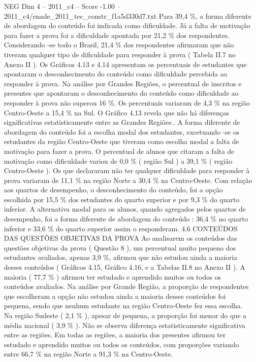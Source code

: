 \begin{textsample}{NEG Dim 4 – 2011\_c4 – Score -1.00 – 2011\_c4/enade\_2011\_tec\_constr\_f1a5d330d7.txt}
Para 39,4 \%, a forma diferente de abordagem do conteúdo foi indicada como dificuldade.
Já a falta de motivação para fazer a prova foi a dificuldade apontada por 21,2 \% dos respondentes.
Considerando -se todo o Brasil, 21,4 \% dos respondentes afirmaram que não tiveram qualquer tipo de dificuldade para responder à prova ( Tabela II.7 no Anexo II ).
Os Gráficos 4.13 e 4.14 apresentam os percentuais de estudantes que apontaram o desconhecimento do conteúdo como dificuldade percebida ao responder à prova.
Na análise por Grandes Regiões, o percentual de inscritos e presentes que apontaram o desconhecimento do conteúdo como dificuldade ao responder à prova não superou 16 \%.
Os percentuais variaram de 4,3 \% na região Centro-Oeste a 15,4 \% na Sul.
O Gráfico 4.13 revela que não há diferenças significativas estatisticamente entre as Grandes Regiões..
A forma diferente de abordagem do conteúdo foi a escolha modal dos estudantes, excetuando -se os estudantes da região Centro-Oeste que tiveram como escolha modal a falta de motivação para fazer a prova.
O percentual de alunos que citaram a falta de motivação como dificuldade variou de 0,0 \% ( região Sul ) a 39,1 \% ( região Centro-Oeste ).
Os que declararam não ter qualquer dificuldade para responder à prova variaram de 11,1 \% na região Norte a 30,4 \% na Centro-Oeste.
Com relação aos quartos de desempenho, o desconhecimento do conteúdo, foi a opção escolhida por 15,5 \% dos estudantes do quarto superior e por 9,3 \% do quarto inferior.
A alternativa modal para os alunos, quando agregados pelos quartos de desempenho, foi a forma diferente de abordagem do conteúdo : 36,4 \% no quarto inferior e 33,6 \% do quarto superior assim o responderam. 4.6 CONTEÚDOS DAS QUESTÕES OBJETIVAS DA PROVA Ao analisarem os conteúdos das questões objetivas da prova ( Questão 8 ), um percentual muito pequeno dos estudantes avaliados, apenas 3,9 \%, afirmou que não estudou ainda a maioria desses conteúdos ( Gráficos 4.15, Gráfico 4.16, e a Tabelas II.8 no Anexo II ).
A maioria ( 77,7 \% ) afirmou ter estudado e aprendido muitos ou todos os conteúdos avaliados.
Na análise por Grande Região, a proporção de respondentes que escolheram a opção não estudou ainda a maioria desses conteúdos foi pequena, sendo que nenhum estudante na região Centro-Oeste fez essa escolha.
Na região Sudeste ( 2,1 \% ), apesar de pequena, a proporção foi menor do que a média nacional ( 3,9 \% ).
Não se observa diferença estatisticamente significativa entre as regiões.
Em todas as regiões, a maioria dos presentes afirmou ter estudado e aprendido muitos ou todos os conteúdos, com proporções variando entre 66,7 \% na região Norte a 91,3 \% na Centro-Oeste.

\end{textsample}
